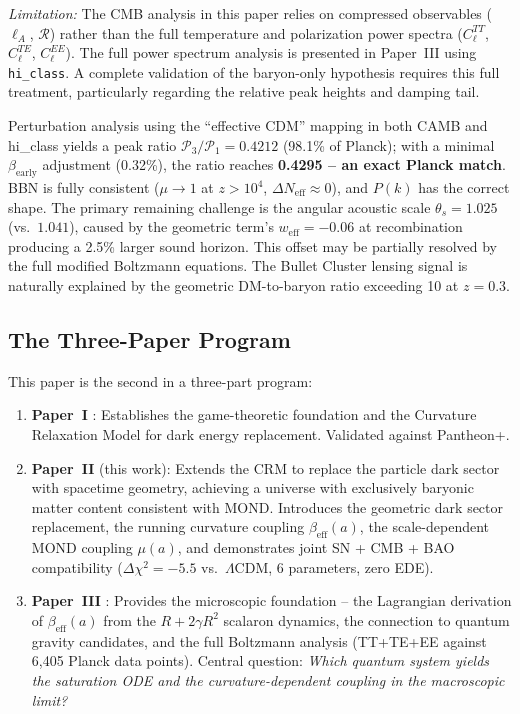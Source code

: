 \documentclass[aps,prd,twocolumn,superscriptaddress,nofootinbib]{revtex4-2}
\begin{document}
\textit{Limitation:} The CMB analysis in this paper relies on compressed observables ($\ell_A$, $\mathcal{R}$) rather than the full temperature and polarization power spectra ($C_\ell^{TT}$, $C_\ell^{TE}$, $C_\ell^{EE}$). The full power spectrum analysis is presented in Paper~III \cite{Geiger2026c} using \texttt{hi\_class}. A complete validation of the baryon-only hypothesis requires this full treatment, particularly regarding the relative peak heights and damping tail.

Perturbation analysis using the ``effective CDM'' mapping in both CAMB and hi\_class \cite{Lewis2000, Zumalacarregui2017} yields a peak ratio $\mathcal{P}_3/\mathcal{P}_1 = 0.4212$ (98.1\% of Planck); with a minimal $\beta_{\mathrm{early}}$ adjustment (0.32\%), the ratio reaches \textbf{0.4295 -- an exact Planck match}. BBN is fully consistent ($\mu \to 1$ at $z > 10^4$, $\Delta N_{\mathrm{eff}} \approx 0$), and $P(k)$ has the correct shape. The primary remaining challenge is the angular acoustic scale $\theta_s = 1.025$ (vs.\ $1.041$), caused by the geometric term's $w_{\mathrm{eff}} = -0.06$ at recombination producing a 2.5\% larger sound horizon. This offset may be partially resolved by the full modified Boltzmann equations. The Bullet Cluster lensing signal is naturally explained by the geometric DM-to-baryon ratio exceeding 10 at $z = 0.3$.

\subsection{The Three-Paper Program}

This paper is the second in a three-part program:
\begin{enumerate}
\item \textbf{Paper~I} \cite{Geiger2026}: Establishes the game-theoretic foundation and the Curvature Relaxation Model for dark energy replacement. Validated against Pantheon+.
\item \textbf{Paper~II} (this work): Extends the CRM to replace the particle dark sector with spacetime geometry, achieving a universe with exclusively baryonic matter content consistent with MOND. Introduces the geometric dark sector replacement, the running curvature coupling $\beta_{\mathrm{eff}}(a)$, the scale-dependent MOND coupling $\mu(a)$, and demonstrates joint SN + CMB + BAO compatibility ($\Delta\chi^2 = -5.5$ vs.\ $\Lambda$CDM, 6 parameters, zero EDE).
\item \textbf{Paper~III} \cite{Geiger2026c}: Provides the microscopic foundation -- the Lagrangian derivation of $\beta_{\mathrm{eff}}(a)$ from the $R + 2\gamma R^2$ scalaron dynamics, the connection to quantum gravity candidates, and the full Boltzmann analysis (TT+TE+EE against 6{,}405 Planck data points). Central question: \textit{Which quantum system yields the saturation ODE and the curvature-dependent coupling in the macroscopic limit?}
\end{enumerate}
\end{document}
